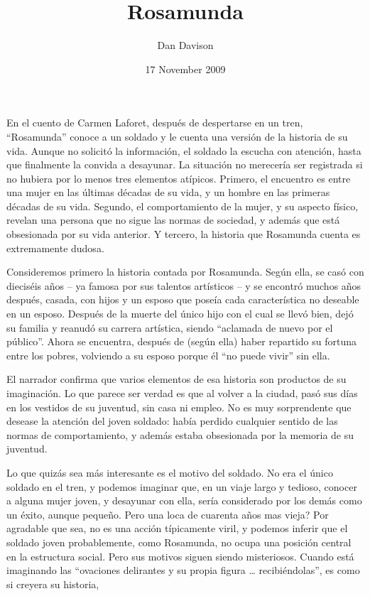 \documentclass[11pt]{article}
\title{Rosamunda}
\author{Dan Davison}
\date{17 November 2009}
\begin{document}
\maketitle


\doublespace

En el cuento de Carmen Laforet, después de despertarse en un tren,
``Rosamunda'' conoce a un soldado y le cuenta una versión de la historia
de su vida. Aunque no solicitó la información, el soldado la escucha
con atención, hasta que finalmente la convida a desayunar. La
situación no merecería ser registrada si no hubiera por lo menos tres
elementos atípicos. Primero, el encuentro es entre una mujer en las
últimas décadas de su vida, y un hombre en las primeras décadas de su
vida. Segundo, el comportamiento de la mujer, y su aspecto físico,
revelan una persona que no sigue las normas de sociedad, y además que
está obsesionada por su vida anterior. Y tercero, la historia que
Rosamunda cuenta es extremamente dudosa.

Consideremos primero la historia contada por Rosamunda. Según ella, se
casó con dieciséis años -- ya famosa por sus talentos artísticos -- y
se encontró muchos años después, casada, con hijos y un esposo que
poseía cada característica no deseable en un esposo. Después de la
muerte del único hijo con el cual se llevó bien, dejó su familia y
reanudó su carrera artística, siendo ``aclamada de nuevo por el
público''. Ahora se encuentra, después de (según ella) haber repartido
su fortuna entre los pobres, volviendo a su esposo porque él ``no puede
vivir'' sin ella.

El narrador confirma que varios elementos de esa historia son
productos de su imaginación. Lo que parece ser verdad es que al volver
a la ciudad, pasó sus días en los vestidos de su juventud, sin casa ni
empleo. No es muy sorprendente que desease la atención del joven
soldado: había perdido cualquier sentido de las normas de
comportamiento, y además estaba obsesionada por la memoria de su
juventud.

Lo que quizás sea más interesante es el motivo del soldado. No era el
único soldado en el tren, y podemos imaginar que, en un viaje largo y
tedioso, conocer a alguna mujer joven, y desayunar con ella, sería
considerado por los demás como un éxito, aunque pequeño. Pero una loca
de cuarenta años mas vieja? Por agradable que sea, no es una acción
típicamente viril, y podemos inferir que el soldado joven
probablemente, como Rosamunda, no ocupa una posición central en la
estructura social. Pero sus motivos siguen siendo misteriosos. Cuando
está imaginando las ``ovaciones delirantes y su propia figura
\ldots{} recibiéndolas'', es como si creyera su historia, 
\end{document}
